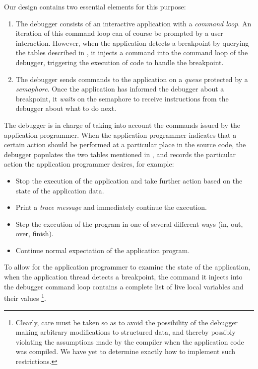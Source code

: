 Our design contains two essential elements for this purpose:

\begin{enumerate}
\item The debugger consists of an interactive application with a
  \emph{command loop}.  An iteration of this command loop can of
  course be prompted by a user interaction.  However, when the
  application detects a breakpoint by querying the tables described in
  , it injects a command into the
  command loop of the debugger, triggering the execution of code to
  handle the breakpoint.
\item The debugger sends commands to the application on a \emph{queue}
  protected by a \emph{semaphore}.  Once the application has informed
  the debugger about a breakpoint, it \emph{waits} on the semaphore to
  receive instructions from the debugger about what to do next.
\end{enumerate}

The debugger is in charge of taking into account the commands issued
by the application programmer.  When the application programmer
indicates that a certain action should be performed at a particular
place in the source code, the debugger populates the two tables
mentioned in , and records the
particular action the application programmer desires, for example:

\begin{itemize}
\item Stop the execution of the application and take further action
  based on the state of the application data.
\item Print a \emph{trace message} and immediately continue the
  execution.
\item Step the execution of the program in one of several different
  ways (in, out, over, finish).
\item Continue normal expectation of the application program.
\end{itemize}

To allow for the application programmer to examine the state of the
application, when the application thread detects a breakpoint, the
command it injects into the debugger command loop contains a complete
list of live local variables and their values%
\footnote{Clearly, care must be taken so as to avoid the possibility
  of the debugger making arbitrary modifications to structured data,
  and thereby possibly violating the assumptions made by the compiler
  when the application code was compiled.  We have yet to determine
  exactly how to implement such restrictions.}.

